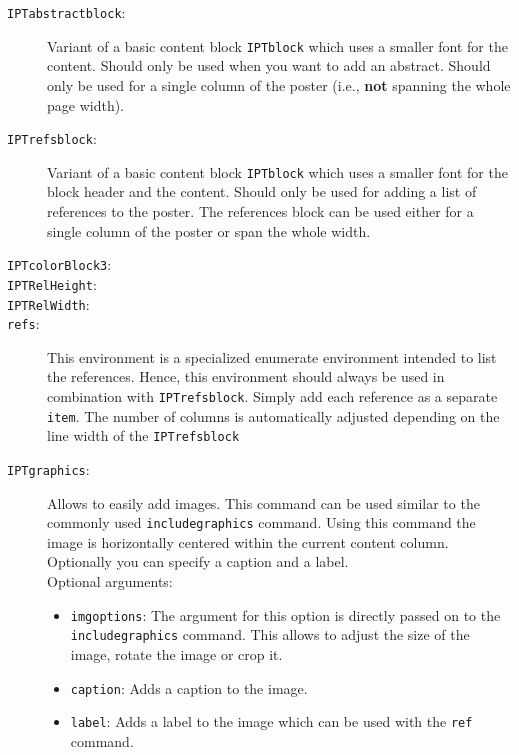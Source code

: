 \begin{description}
	\item[\texttt{IPTabstractblock}:] Variant of a basic content block \texttt{IPTblock} which uses a smaller font for the content. Should only be used when you want to add an abstract. Should only be used for a single column of the poster (i.e., \textbf{not} spanning the whole page width).

	\item[\texttt{IPTrefsblock}:] Variant of a basic content block \texttt{IPTblock} which uses a smaller font for the block header and the content. Should only be used for adding a list of references to the poster. The references block can be used either for a single column of the poster or span the whole width.

	\item[\texttt{IPTcolorBlock3}:]

	\item[\texttt{IPTRelHeight}:]

	\item[\texttt{IPTRelWidth}:]

	\item[\texttt{refs}:] This environment is a specialized enumerate environment intended to list the references. Hence, this environment should always be used in combination with \texttt{IPTrefsblock}. Simply add each reference as a separate \texttt{\bs{}item}. The number of columns is automatically adjusted depending on the line width of the \texttt{\bs{}IPTrefsblock}\\

	\item[\texttt{\bs{}IPTgraphics}:] Allows to easily add images. This command can be used similar to the commonly used \texttt{includegraphics} command. Using this command the image is horizontally centered within the current content column. Optionally you can specify a caption and a label.\\
	Optional arguments:
	\begin{itemize}
		\item \texttt{imgoptions}: The argument for this option is directly passed on to the \texttt{includegraphics} command. This allows to adjust the size of the image, rotate the image or crop it.
		\item \texttt{caption}: Adds a caption to the image.
		\item \texttt{label}: Adds a label to the image which can be used with the \texttt{ref} command.
	\end{itemize}



\end{description}
